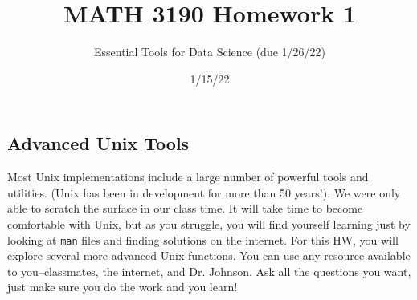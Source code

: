 \documentclass[11pt]{article}
\title{MATH 3190 Homework 1}
\author{Essential Tools for Data Science (due 1/26/22)}
\date{1/15/22}                                           %
\begin{document}
\maketitle

\subsection*{Advanced Unix Tools}
Most Unix implementations include a large number of powerful tools and utilities. (Unix has been in development for more than 50 years!). We were only able to scratch the surface in our class time. It will take time to become comfortable with Unix, but as you struggle, you will find yourself learning just by looking at \texttt{man} files and finding solutions on the internet. For this HW, you will explore several more advanced Unix functions. You can use any resource available to you--classmates, the internet, and Dr. Johnson. Ask all the questions you want, just make sure you do the work and you learn! 
\end{document}
